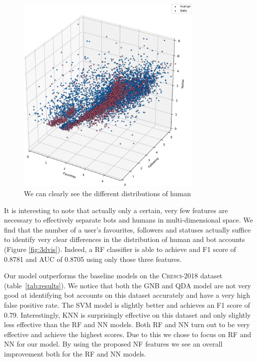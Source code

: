 \begin{figure}
    \centering
    \includegraphics[width=0.8\textwidth]{paper/FIG/3dvis_base-crop.pdf}
    \caption{We can clearly see the different distributions of human }
    \label{fig:my_label}
\end{figure}

\noindent It is interesting to note that actually only a certain, very few features are necessary to effectively separate bots and humans in multi-dimensional space. We find that the number of a user's favourites, followers and statuses actually suffice to identify very clear differences in the distribution of human and bot accounts (Figure \ref{fig:3dvis}). Indeed, a RF classifier is able to achieve and F1 score of 0.8781 and AUC of 0.8705 using only those three features.

Our model outperforms the baseline models on the \textsc{Cresci-2018} dataset (table~\ref{tab:results}). We notice that both the GNB and QDA model are not very good at identifying bot accounts on this dataset accurately and have a very high false positive rate. The SVM model is slightly better and achieves an F1 score of 0.79. Interestingly, KNN is surprisingly effective on this dataset and only slightly less effective than the RF and NN models. Both RF and NN turn out to be very effective and achieve the highest scores. Due to this we chose to focus on RF and NN for our model. By using the proposed NF features we see an overall improvement both for the RF and NN models.

